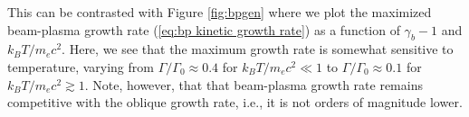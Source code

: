 \documentclass[usenatbib,iop,apj,numberedappendix]{aeb_emulateapj_2015}
\newcommand\bmath[1] {\mbox{\boldmath$\rm #1$}}
\newcommand{\kvec}{\ensuremath{\bmath{k}}}
\begin{document}
This can be contrasted with Figure \ref{fig:bpgen} where we plot the maximized beam-plasma growth rate  (\ref{eq:bp kinetic growth rate}) as a function of $\gamma_b - 1$ and $k_B T/m_ec^2$.   Here, we see that the maximum growth rate is somewhat sensitive to temperature, varying from $\Gamma/\Gamma_0 \approx 0.4$ for $k_BT/m_ec^2 \ll 1$ to $\Gamma/\Gamma_0 \approx 0.1$ for $k_BT/m_ec^2 \gtrsim 1$.  Note, however, that that beam-plasma growth rate remains competitive with the oblique growth rate, i.e., it is not orders of magnitude lower.  




% 
% 
\end{document}
